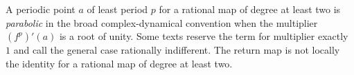 
A periodic point $a$ of least period $p$ for a rational map of degree at least two is \emph{parabolic} in the broad complex-dynamical convention when the multiplier $(f^p)'(a)$ is a root of unity. Some texts reserve the term for multiplier exactly $1$ and call the general case rationally indifferent. The return map is not locally the identity for a rational map of degree at least two.
